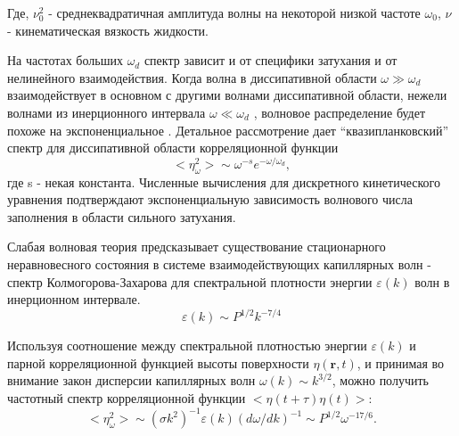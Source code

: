 
Где, $\nu_0^2$ - среднеквадратичная амплитуда волны на некоторой низкой частоте $\omega_0$, $\nu$ - кинематическая вязкость жидкости.

На частотах больших $\omega_d$ спектр зависит и от специфики затухания и от нелинейного взаимодействия. Когда волна в диссипативной области $\omega \gg \omega_d$ взаимодействует в основном с другими волнами диссипативной области, нежели волнами из инерционного интервала $\omega \ll \omega_d$ , волновое распределение будет похоже на экспоненциальное \cite{Ryzhenkova1990}. Детальное рассмотрение дает “квазипланковский” спектр для диссипативной области корреляционной функции \cite{Brazhnikov_IET}
\begin{equation}
<\eta_\omega^2> \sim \omega^{-s} e^{-\omega/\omega_d},
\end{equation}			
где s - некая константа. Численные вычисления для дискретного кинетического уравнения \cite{Brazhnikov_IET} подтверждают экспоненциальную зависимость волнового числа заполнения в области сильного затухания.
	


Слабая волновая теория предсказывает существование стационарного неравновесного состояния в системе взаимодействующих капиллярных волн - спектр Колмогорова-Захарова для спектральной плотности энергии $\varepsilon(k)$ волн в инерционном интервале.
\begin{equation}
 \varepsilon(k) \sim P^{1/2}k^{-7/4}
\end{equation}

Используя соотношение между спектральной плотностью энергии $\varepsilon(k)$ и парной корреляционной функцией высоты поверхности $\eta(\mathbf{r}, t)$, и принимая во внимание закон дисперсии капиллярных волн $\omega(k) \sim k^{3/2}$, можно получить частотный спектр корреляционной функции $<\eta(t+\tau)\eta(t)>$:
\begin{equation}
<\eta_\omega^2> \sim (\sigma k^2)^{-1} \varepsilon(k)(d\omega/dk)^{-1} \sim P^{1/2} \omega^{-17/6}.
\end{equation}



